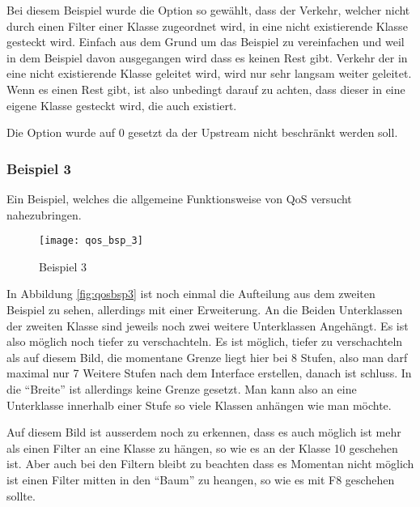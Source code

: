    Bei diesem Beispiel wurde die Option  so
   gewählt, dass der Verkehr, welcher nicht durch einen Filter einer
   Klasse zugeordnet wird, in eine nicht existierende Klasse gesteckt
   wird. Einfach aus dem Grund um das Beispiel zu vereinfachen und weil
   in dem Beispiel davon ausgegangen wird dass es keinen Rest gibt.
   Verkehr der in eine nicht existierende Klasse geleitet wird, wird nur
   sehr langsam weiter geleitet. Wenn es einen Rest gibt, ist also
   unbedingt darauf zu achten, dass dieser in eine eigene Klasse gesteckt
   wird, die auch existiert.

   Die Option  wurde auf 0 gesetzt da der Upstream
   nicht beschränkt werden soll.



\subsubsection{Beispiel 3}



   Ein Beispiel, welches die allgemeine Funktionsweise von QoS versucht
   nahezubringen.

   \begin{figure}[htbp]
     \centering
     \texttt{[image: qos\_bsp\_3]}
     \caption{Beispiel 3}
   \end{figure}


   In Abbildung \ref{fig:qosbsp3} ist noch einmal die Aufteilung aus
   dem zweiten Beispiel zu sehen, allerdings mit einer Erweiterung. An
   die Beiden Unterklassen der zweiten Klasse sind jeweils noch zwei
   weitere Unterklassen Angehängt. Es ist also möglich noch tiefer
   zu verschachteln. Es ist möglich, tiefer zu verschachteln als auf
   diesem Bild, die momentane Grenze liegt hier bei 8 Stufen, also man
   darf maximal nur 7 Weitere Stufen nach dem Interface erstellen,
   danach ist schluss. In die ``Breite'' ist allerdings keine Grenze
   gesetzt. Man kann also an eine Unterklasse innerhalb einer Stufe so
   viele Klassen anhängen wie man möchte.

   Auf diesem Bild ist ausserdem noch zu erkennen, dass es auch möglich
   ist mehr als einen Filter an eine Klasse zu hängen, so wie es an der
   Klasse 10 geschehen ist. Aber auch bei den Filtern bleibt zu beachten
   dass es Momentan nicht möglich ist einen Filter mitten in den ``Baum''
   zu heangen, so wie es mit F8 geschehen sollte.

